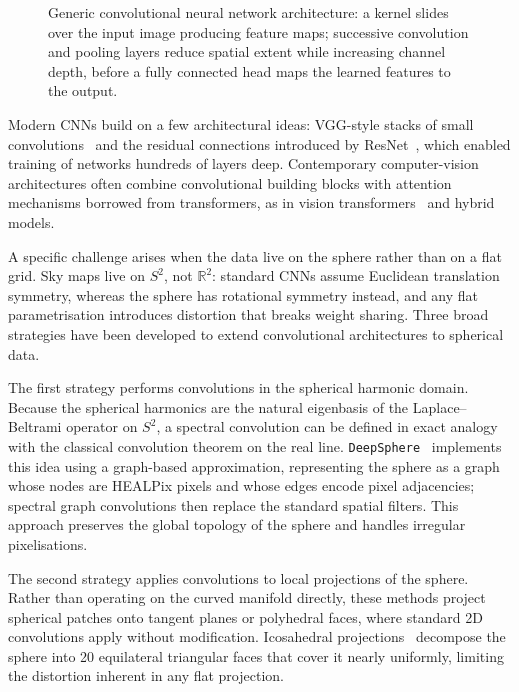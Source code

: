 \begin{figure}[t]
  \centering
  \caption{Generic convolutional neural network architecture: a kernel slides over the input image producing feature maps; successive convolution and pooling layers reduce spatial extent while increasing channel depth, before a fully connected head maps the learned features to the output.}
  \label{fig:cnn-architecture}
\end{figure}

Modern CNNs build on a few architectural ideas: VGG-style stacks of small convolutions~\cite{Simonyan:2014cmh} and the residual connections introduced by ResNet~\cite{he2015deep}, which enabled training of networks hundreds of layers deep.
Contemporary computer-vision architectures often combine convolutional building blocks with attention mechanisms borrowed from transformers, as in vision transformers~\cite{Dosovitskiy:2020qjv} and hybrid models.

A specific challenge arises when the data live on the sphere rather than on a flat grid.
Sky maps live on $S^2$, not $\mathbb{R}^2$: standard CNNs assume Euclidean translation symmetry, whereas the sphere has rotational symmetry instead, and any flat parametrisation introduces distortion that breaks weight sharing.
Three broad strategies have been developed to extend convolutional architectures to spherical data.

The first strategy performs convolutions in the spherical harmonic domain.
Because the spherical harmonics are the natural eigenbasis of the Laplace--Beltrami operator on $S^2$, a spectral convolution can be defined in exact analogy with the classical convolution theorem on the real line.
\texttt{DeepSphere}~\cite{DBLP:journals/corr/abs-2012-15000} implements this idea using a graph-based approximation, representing the sphere as a graph whose nodes are HEALPix pixels and whose edges encode pixel adjacencies; spectral graph convolutions then replace the standard spatial filters.
This approach preserves the global topology of the sphere and handles irregular pixelisations.

The second strategy applies convolutions to local projections of the sphere.
Rather than operating on the curved manifold directly, these methods project spherical patches onto tangent planes or polyhedral faces, where standard 2D convolutions apply without modification.
Icosahedral projections~\cite{eder2019convolutions} decompose the sphere into 20 equilateral triangular faces that cover it nearly uniformly, limiting the distortion inherent in any flat projection.

